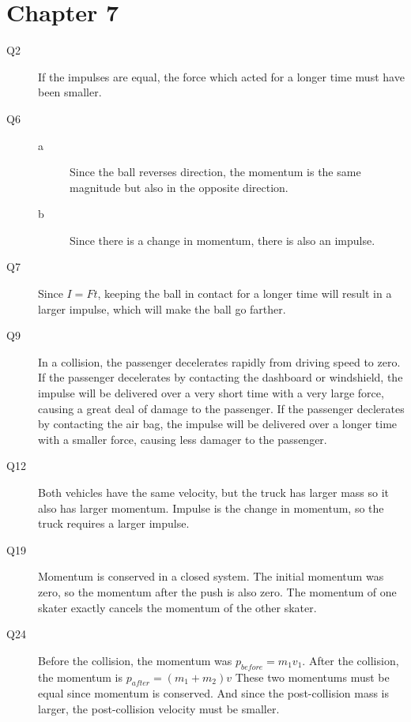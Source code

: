 \documentclass{exam}
\begin{document}
\ifprintanswers

\section{Chapter 7}
\begin{description}

\item[Q2]
If the impulses are equal, the force which acted for a longer time must have been smaller.

\item[Q6]
\begin{description}
\item[a] Since the ball reverses direction, the momentum is the same magnitude but also in the opposite direction.
\item[b] Since there is a change in momentum, there is also an impulse.
\end{description}

\item[Q7]
Since $I = Ft$, keeping the ball in contact for a longer time will result in a larger impulse, which will make the ball go farther.

\item[Q9]
In a collision, the passenger decelerates rapidly from driving speed to zero.  If the passenger decelerates by
contacting the dashboard or windshield, the impulse will be delivered over a very short time with a very large force,
causing a great deal of damage to the passenger.  If the passenger declerates by contacting the air bag, the impulse
will be delivered over a longer time with a smaller force, causing less damager to the passenger.

\item[Q12]
Both vehicles have the same velocity, but the truck has larger mass so it also has larger momentum.  Impulse is the
change in momentum, so the truck requires a larger impulse.

\item[Q19]
Momentum is conserved in a closed system.  The initial momentum was zero, so the momentum after the push is also zero.
The momentum of one skater exactly cancels the momentum of the other skater.

\item[Q24]
Before the collision, the momentum was $p_{before} = m_1v_1$.  After the collision, the momentum is 
$p_{after} = (m_1 + m_2) v$  These two momentums must be equal since momentum is conserved.  And since the
post-collision mass is larger, the post-collision velocity must be smaller.


\end{description}
\end{document}

